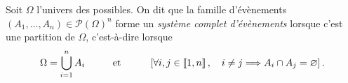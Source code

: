 \documentclass{magnolia}
\begin{document}
  

\begin{definition}
Soit $\Omega$ l'univers des possibles. On dit que la famille d'évènements
$(A_1,\ldots,A_n)\in\mathcal{P}(\Omega)^n$ forme un \emph{système complet d'évènements}
lorsque c'est une partition de $\Omega$, c'est-à-dire lorsque
\[\Omega = \bigcup_{i=1}^n A_i \qquad\quad\!\text{et}\quad\!\qquad \left[\forall i,j\in\left\llbracket 1,n\right\rrbracket,\quad i\neq j\Longrightarrow
  A_i\cap A_j=\varnothing\right].\]
\end{definition}
\end{document}
